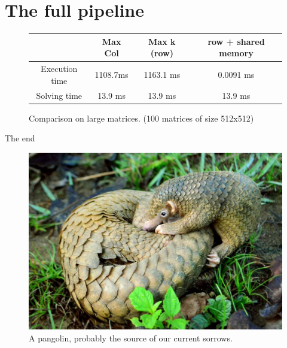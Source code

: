 \documentclass[compress,xcolor=table]{beamer}
\begin{document}
\section{The full pipeline}
\begin{frame}
	\begin{figure}
	\centering
	\begin{tabular}{c|c|c|c}
		& Max Col & Max k (row) & row + shared memory \\
		\hline
		Execution time & 1108.7ms &  1163.1 ms & 0.0091 ms  \\
		Solving time & 13.9 ms & 13.9 ms & 13.9 ms \\		
	\end{tabular}
	
	\caption{Comparison on large matrices. (100 matrices of size 512x512)}
\end{figure}
\end{frame}


\begin{frame}{The end}
	\begin{figure}
		\centering
		\includegraphics[scale=0.25]{images/pangolin.jpg}
		\caption{A pangolin, probably the source of our current sorrows.}
	\end{figure}
\end{frame}
\end{document}
